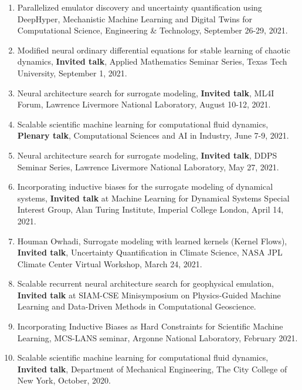 \documentclass[letterpaper]{article}
\begin{document}
\begin{enumerate}


\item Parallelized emulator discovery and uncertainty quantification using DeepHyper, Mechanistic Machine Learning and Digital Twins for Computational Science, Engineering \& Technology, September 26-29, 2021.

\item Modified neural ordinary differential equations for stable learning of chaotic dynamics, \textbf{Invited talk}, Applied Mathematics Seminar Series, Texas Tech University, September 1, 2021.

\item Neural architecture search for surrogate modeling, \textbf{Invited talk}, ML4I Forum, Lawrence Livermore National Laboratory, August 10-12, 2021.

\item Scalable scientific machine learning for computational fluid dynamics, \textbf{Plenary talk}, Computational Sciences and AI in Industry, June 7-9, 2021.

\item Neural architecture search for surrogate modeling, \textbf{Invited talk}, DDPS Seminar Series, Lawrence Livermore National Laboratory, May 27, 2021.

\item Incorporating inductive biases for the surrogate modeling of dynamical systems, \textbf{Invited talk} at Machine Learning for Dynamical Systems Special Interest Group, Alan Turing Institute, Imperial College London, April 14, 2021.

\item Houman Owhadi, Surrogate modeling with learned kernels (Kernel Flows), \textbf{Invited talk}, Uncertainty Quantification in Climate Science, NASA JPL Climate Center Virtual Workshop, March 24, 2021.

\item Scalable recurrent neural architecture search for geophysical emulation, \textbf{Invited talk} at SIAM-CSE Minisymposium on Physics-Guided Machine Learning and Data-Driven Methods in Computational Geoscience.

\item Incorporating Inductive Biases as Hard Constraints for Scientific Machine Learning, MCS-LANS seminar, Argonne National Laboratory, February 2021.

\item Scalable scientific machine learning for computational fluid dynamics, \textbf{Invited talk}, Department of Mechanical Engineering, The City College of New York, October, 2020.


\end{enumerate}
\end{document}
